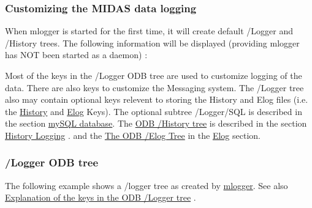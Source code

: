 \subsubsection{Customizing the MIDAS data logging}\label{F_Logging_Data}
\label{F_Logging_Data_idx_Logging_Data}
\hypertarget{F_Logging_Data_idx_Logging_Data}{}
 

\par


When mlogger is started for the first time, it will create default /Logger and /History trees. The following information will be displayed (providing mlogger has NOT been started as a daemon) : 


Most of the keys in the /Logger ODB tree are used to customize logging of the data. There are also keys to customize the Messaging system. The /Logger tree also may contain optional keys relevent to storing the History and Elog files (i.e. the \hyperlink{F_History_logging_F_Logger_History_Dir}{History} and \hyperlink{F_Elog_F_Logger_Elog_Dir}{Elog} Keys). The optional subtree /Logger/SQL is described in the section \hyperlink{F_mySQL}{mySQL database}. The \hyperlink{F_History_logging_F_ODB_History_tree}{ODB /History tree} is described in the section \hyperlink{F_History_logging}{History Logging} . and the \hyperlink{F_Elog_F_ODB_Elog_Tree}{The ODB /Elog Tree} in the \hyperlink{F_Elog}{Elog} section.

\label{F_Logging_Data_idx_ODB_tree_Logger}
\hypertarget{F_Logging_Data_idx_ODB_tree_Logger}{}
 \hypertarget{F_Logging_Data_F_Logger_tree}{}\subsubsection{/Logger ODB tree}\label{F_Logging_Data_F_Logger_tree}
The following example shows a /logger tree as created by \hyperlink{F_Logging_F_mlogger_utility}{mlogger}. See also \hyperlink{F_Logging_Data_F_Logger_tree_keys}{Explanation of the keys in the ODB /Logger tree} .


